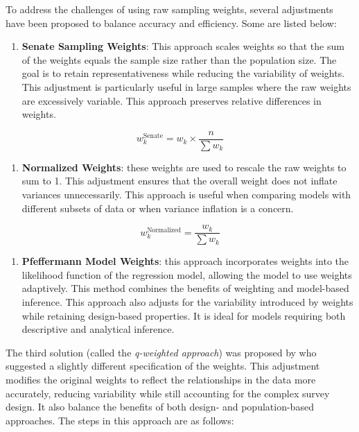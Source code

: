 \documentclass[
  12pt,
]{book}
\providecommand{\tightlist}{%
  \setlength{\itemsep}{0pt}\setlength{\parskip}{0pt}}
\begin{document}
To address the challenges of using raw sampling weights, several adjustments have been proposed to balance accuracy and efficiency. Some are listed below:

\begin{enumerate}
\def\labelenumi{\arabic{enumi}.}
\tightlist
\item
  \textbf{Senate Sampling Weights}: This approach scales weights so that the sum of the weights equals the sample size rather than the population size. The goal is to retain representativeness while reducing the variability of weights. This adjustment is particularly useful in large samples where the raw weights are excessively variable. This approach preserves relative differences in weights.
\end{enumerate}

\[
w^{\text{Senate}}_k = w_k \times \frac{n}{\sum w_k}
\]

\begin{enumerate}
\def\labelenumi{\arabic{enumi}.}
\setcounter{enumi}{1}
\tightlist
\item
  \textbf{Normalized Weights}: these weights are used to rescale the raw weights to sum to 1. This adjustment ensures that the overall weight does not inflate variances unnecessarily. This approach is useful when comparing models with different subsets of data or when variance inflation is a concern.
\end{enumerate}

\[
w^{\text{Normalized}}_k = \frac{w_k}{\sum w_k}
\]

\begin{enumerate}
\def\labelenumi{\arabic{enumi}.}
\setcounter{enumi}{2}
\tightlist
\item
  \textbf{Pfeffermann Model Weights}: this approach incorporates weights into the likelihood function of the regression model, allowing the model to use weights adaptively. This method combines the benefits of weighting and model-based inference. This approach also adjusts for the variability introduced by weights while retaining design-based properties. It is ideal for models requiring both descriptive and analytical inference.
\end{enumerate}

The third solution (called the \emph{q-weighted approach}) was proposed by \citet{pfeffermann2011modelling} who suggested a slightly different specification of the weights. This adjustment modifies the original weights to reflect the relationships in the data more accurately, reducing variability while still accounting for the complex survey design. It also balance the benefits of both design- and population-based approaches. The steps in this approach are as follows:
\end{document}
